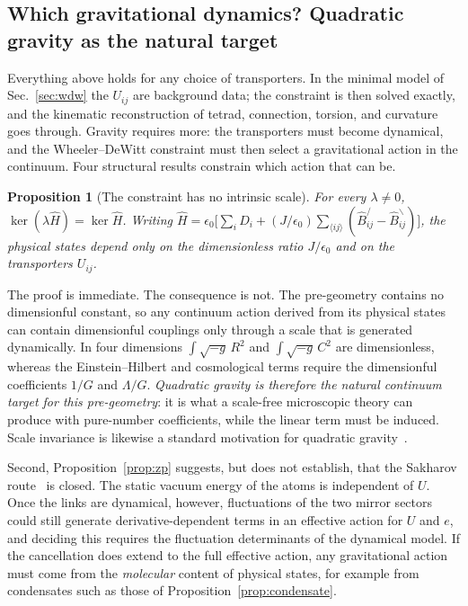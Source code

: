 \documentclass[reprint,aps,prd,amsmath,amssymb,superscriptaddress,nofootinbib,floatfix]{revtex4-2}
\theoremstyle{plain}
\newtheorem{proposition}{Proposition}
\theoremstyle{definition}
\theoremstyle{remark}
\newcommand{\Lat}{\ensuremath{/}}                 %
\newcommand{\Rat}{\ensuremath{\backslash}}        %
\newcommand{\Hc}{\hat{H}}
\begin{document}
\subsection{Which gravitational dynamics? Quadratic gravity as the natural target}
\label{sec:dynamics}

Everything above holds for any choice of transporters. In the minimal model of Sec.~\ref{sec:wdw} the
$U_{ij}$ are background data; the constraint is then solved exactly, and the kinematic reconstruction of
tetrad, connection, torsion, and curvature goes through. Gravity requires more: the transporters must
become dynamical, and the Wheeler--DeWitt constraint must then select a gravitational action in the
continuum. Four structural results constrain which action that can be.

\begin{proposition}[The constraint has no intrinsic scale]
\label{prop:scale}
For every $\lambda\neq0$, $\ker(\lambda\Hc)=\ker\Hc$. Writing
$\Hc=\epsilon_0\big[\sum_i\hat D_i+(J/\epsilon_0)\sum_{\langle ij\rangle}(\hat B^\Lat_{ij}-\hat B^\Rat_{ij})\big]$, the
physical states depend only on the dimensionless ratio $J/\epsilon_0$ and on the transporters $U_{ij}$.
\end{proposition}

The proof is immediate. The consequence is not. The pre-geometry contains no dimensionful constant, so any
continuum action derived from its physical states can contain dimensionful couplings only through a scale
that is generated dynamically. In four dimensions $\int\sqrt{-g}\,R^2$ and $\int\sqrt{-g}\,C^2$ are dimensionless,
whereas the Einstein--Hilbert and cosmological terms require the dimensionful coefficients $1/G$ and
$\Lambda/G$. \emph{Quadratic gravity is therefore the natural continuum target for this pre-geometry}: it is what a
scale-free microscopic theory can produce with pure-number coefficients, while the linear term must be
induced. Scale invariance is likewise a standard motivation for quadratic gravity~\cite{AlvarezGaume2016}.

Second, Proposition~\ref{prop:zp} suggests, but does not establish, that the Sakharov route~\cite{Sakharov2000} is closed. The
static vacuum energy of the atoms is independent of $U$. Once the links are dynamical, however, fluctuations of the
two mirror sectors could still generate derivative-dependent terms in an effective action for $U$ and $e$, and deciding
this requires the fluctuation determinants of the dynamical model. If the cancellation does extend to the full
effective action, any gravitational action must come from the \emph{molecular} content of physical states, for example
from condensates such as those of Proposition~\ref{prop:condensate}.
\end{document}
